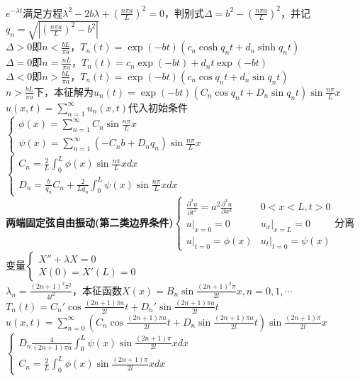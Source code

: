 \documentclass[10pt,a4paper]{article}
\begin{document}
\begin{multicols}{2}
$e^{-\lambda t}$满足方程$\lambda^2-2b\lambda+(\frac{n\pi a}{L})^2=0$，判别式$\Delta=b^2-(\frac{n\pi a}{L})^2$，并记$q_n=\sqrt{|(\frac{n\pi a}{L})^2-b^2|}$\\
$\Delta>0$即$n<\frac{bL}{\pi a}$，$T_n(t)=\exp(-bt)(c_n\cosh q_nt+d_n\sinh q_nt)$\\
$\Delta=0$即$n=\frac{nL}{\pi a}$，$T_n(t)=c_n\exp(-bt)+d_nt\exp(-bt)$\\
$\Delta<0$即$n>\frac{bL}{\pi a}$，$T_n(t)=\exp(-bt)(c_n\cos q_nt+d_n\sin q_nt)$\\
$n>\frac{bL}{\pi a}$下，本征解为$u_n(t)=\exp(-bt)(C_n\cos q_nt+D_n\sin q_nt)\sin\frac{n\pi}{L}x$\\
$u(x,t)=\sum_{n=1}^{\infty}u_n(x,t)$代入初始条件$\left\{\begin{array}{l}\phi(x)=\sum_{n=1}^{\infty}C_n\sin\frac{n\pi}{L}x\\\psi(x)=\sum_{n=1}^{\infty}(-C_nb+D_nq_n)\sin\frac{n\pi}{L}x\end{array}\right.$\\
\indent{}$\left\{\begin{array}{l}C_n=\frac{2}{L}\int_0^L\phi(x)\sin\frac{n\pi}{L}xdx\\D_n=\frac{b}{q_n}C_n+\frac{2}{Lq_n}\int_0^L\psi(x)\sin\frac{n\pi}{L}xdx\end{array}\right.$\\
\textbf{两端固定弦自由振动(第二类边界条件)}$\left\{\begin{array}{ll}\frac{\partial^2u}{\partial t^2}=a^2\frac{\partial^2u}{\partial x^2}&0<x<L,t>0\\u|_{x=0}=0&u_x|_{x=L}=0\\u|_{t=0}=\phi(x)&u_t|_{t=0}=\psi(x)\end{array}\right.$分离变量$\left\{\begin{array}{l}X''+\lambda X=0\\X(0)=X'(L)=0\end{array}\right.$\\
$\lambda_n=\frac{(2n+1)^2\pi^2}{4l^2}$，本征函数$X(x)=B_n\sin\frac{(2n+1)^2\pi}{2l}x,n=0,1,\cdots$\\
$T_n(t)=C_n'\cos\frac{(2n+1)\pi a}{2l}t+D_n'\sin\frac{(2n+1)\pi a}{2l}t$\\
$u(x,t)=\sum_{n=0}^{\infty}(C_n\cos\frac{(2n+1)\pi a}{2l}t+D_n\sin\frac{(2n+1)\pi a}{2l}t)\sin\frac{(2n+1)\pi}{2l}x$\\
$\left\{\begin{array}{l}D_n\frac{4}{(2n+1)\pi a}\int_0^L\psi(x)\sin\frac{(2n+1)\pi}{2l}xdx\\C_n=\frac{2}{L}\int_0^L\phi(x)\sin\frac{(2n+1)\pi}{2l}xdx\end{array}\right.$\\

\end{multicols}
\end{document}
